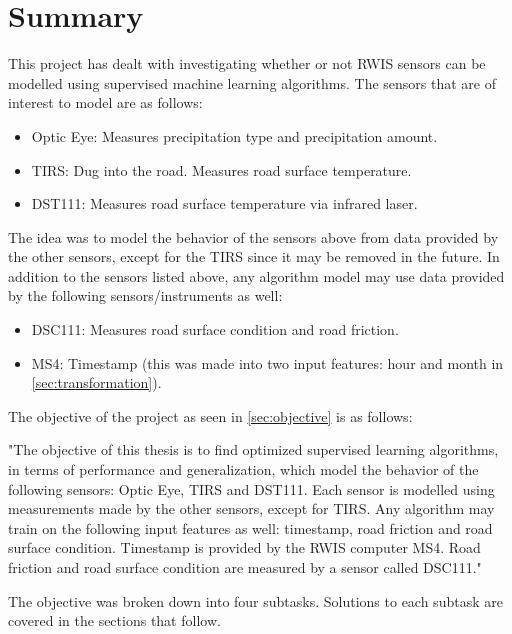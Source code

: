 \chapter{Summary}

	This project has dealt with investigating whether or not RWIS sensors can be modelled using supervised machine learning algorithms. The sensors that are of interest to model are as follows:
	\begin{itemize}
		\item{Optic Eye:} Measures precipitation type and precipitation amount.
		\item{TIRS:} Dug into the road. Measures road surface temperature.
		\item{DST111:} Measures road surface temperature via infrared laser.
	\end{itemize}
	
	The idea was to model the behavior of the sensors above from data provided by the other sensors, except for the TIRS since it may be removed in the future. In addition to the sensors listed above, any algorithm model may use data provided by the following sensors/instruments as well:
	\begin{itemize}
		\item{DSC111:} Measures road surface condition and road friction.
		\item{MS4:} Timestamp (this was made into two input features: hour and month in \ref{sec:transformation}).
	\end{itemize}

	The objective of the project as seen in \ref{sec:objective} is as follows:

	"The objective of this thesis is to find optimized supervised learning algorithms, in terms of performance and generalization, which model the behavior of the following sensors: Optic Eye, TIRS and DST111. Each sensor is modelled using measurements made by the other sensors, except for TIRS. Any algorithm may train on the following input features as well: timestamp, road friction and road surface condition. Timestamp is provided by the RWIS computer MS4. Road friction and road surface condition are measured by a sensor called DSC111."

	The objective was broken down into four subtasks. Solutions to each subtask are covered in the sections that follow.

